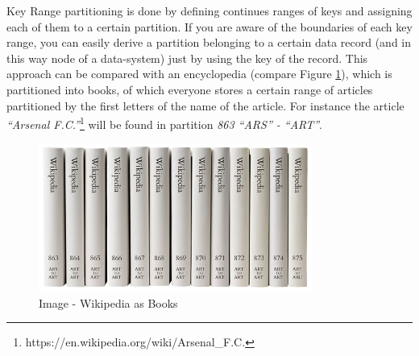 {
\label{tf_dds_partitioning_key_value_keyrange}
Key Range partitioning is done by defining continues ranges of keys and assigning each of them to a certain partition. If you are aware of the boundaries of each key range, you can easily derive a partition belonging to a certain data record (and in this way node of a data-system) just by using the key of the record. This approach can be compared with an encyclopedia (compare Figure \ref{partitioning_image_wikipedia_as_book}), which is partitioned into books, of which everyone stores a certain range of articles partitioned by the first letters of the name of the article. For instance the article \textit{``Arsenal F.C.''}\footnote{https://en.wikipedia.org/wiki/Arsenal\_F.C.} will be found in partition \textit{863 ``ARS'' - ``ART''}.\\

\begin{figure}[h]
	\centering
  \includegraphics[width=0.8\textwidth]{wikipedia_as_book.jpg}
	\caption{Image - Wikipedia as Books}
	\label{partitioning_image_wikipedia_as_book}
\end{figure}

}

